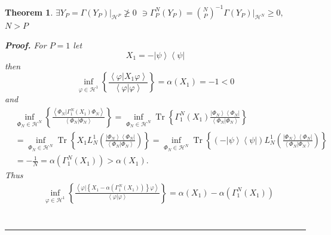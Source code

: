 \documentclass[aps,preprint]{revtex4}%
\newtheorem{theorem}{Theorem}
\newenvironment{proof}[1][Proof]{\noindent\textbf{#1.} }{\ \rule{0.5em}{0.5em}}
\begin{document}
\begin{theorem}
$\exists Y_{P}=\left.  \Gamma\left(  Y_{P}\right)  \right\vert _{\mathcal{H}%
^{P}}\ngeq0$ $\ni\Gamma_{P}^{N}\left(  Y_{P}\right)  =\binom{N}{P}^{-1}\left.
\Gamma\left(  Y_{P}\right)  \right\vert _{\mathcal{H}^{N}}\geq0,$ $N>P$

\begin{proof}
For $P=1$ let
\begin{equation}
X_{1}=-\left\vert \psi\right\rangle \left\langle \psi\right\vert
\end{equation}
then
\begin{equation}
\inf_{\varphi\in\mathcal{H}^{1}}\left\{  \frac{\left\langle \left.
\varphi\right\vert X_{1}\varphi\right\rangle }{\left\langle \left.
\varphi\right\vert \varphi\right\rangle }\right\}  =\alpha\left(
X_{1}\right)  =-1<0
\end{equation}
and
\begin{align}
&  \inf_{\Phi_{N}\in\mathcal{H}^{N}}\left\{  \frac{\left\langle \left.
\Phi_{N}\right\vert \Gamma_{1}^{N}\left(  X_{1}\right)  \Phi_{N}\right\rangle
}{\left\langle \left.  \Phi_{N}\right\vert \Phi_{N}\right\rangle }\right\}
=\inf_{\Phi_{N}\in\mathcal{H}^{N}}\operatorname{Tr}\left\{  \Gamma_{1}%
^{N}\left(  X_{1}\right)  \frac{\left\vert \Phi_{N}\right\rangle \left\langle
\Phi_{N}\right\vert }{\left\langle \left.  \Phi_{N}\right\vert \Phi
_{N}\right\rangle }\right\} \nonumber\\
&  =\inf_{\Phi_{N}\in\mathcal{H}^{N}}\operatorname{Tr}\left\{  X_{1}L_{N}%
^{1}\left(  \frac{\left\vert \Phi_{N}\right\rangle \left\langle \Phi
_{N}\right\vert }{\left\langle \left.  \Phi_{N}\right\vert \Phi_{N}%
\right\rangle }\right)  \right\}  =\inf_{\Phi_{N}\in\mathcal{H}^{N}%
}\operatorname{Tr}\left\{  \left(  -\left\vert \psi\right\rangle \left\langle
\psi\right\vert \right)  L_{N}^{1}\left(  \frac{\left\vert \Phi_{N}%
\right\rangle \left\langle \Phi_{N}\right\vert }{\left\langle \left.  \Phi
_{N}\right\vert \Phi_{N}\right\rangle }\right)  \right\} \nonumber\\
&  =-\frac{1}{N}=\alpha\left(  \Gamma_{1}^{N}\left(  X_{1}\right)  \right)
>\alpha\left(  X_{1}\right)  .
\end{align}
Thus
\begin{align}
&  \inf_{\varphi\in\mathcal{H}^{1}}\left\{  \frac{\left\langle \left.
\varphi\right\vert \left\{  X_{1}-\alpha\left(  \Gamma_{1}^{N}\left(
X_{1}\right)  \right)  \right\}  \varphi\right\rangle }{\left\langle \left.
\varphi\right\vert \varphi\right\rangle }\right\}  =\alpha\left(
X_{1}\right)  -\alpha\left(  \Gamma_{1}^{N}\left(  X_{1}\right)  \right) \\

\end{align}
\end{proof}
\end{theorem}
\end{document}
